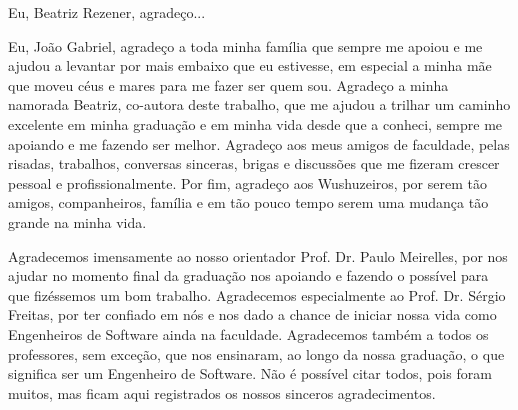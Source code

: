 \begin{agradecimentos}

Eu, Beatriz Rezener, agradeço...

Eu, João Gabriel, agradeço a toda minha família que sempre me apoiou e me ajudou a levantar por mais embaixo que eu estivesse, em especial a minha mãe que moveu céus e mares para me fazer ser quem sou.
Agradeço a minha namorada Beatriz, co-autora deste trabalho, que me ajudou a trilhar um caminho excelente em minha graduação e em minha vida desde que a conheci, sempre me apoiando e me fazendo ser melhor.
Agradeço aos meus amigos de faculdade, pelas risadas, trabalhos, conversas sinceras, brigas e discussões que me fizeram crescer pessoal e profissionalmente.
Por fim, agradeço aos Wushuzeiros, por serem tão amigos, companheiros, família e em tão pouco tempo serem uma mudança tão grande na minha vida.

Agradecemos imensamente ao nosso orientador Prof. Dr. Paulo Meirelles, por nos ajudar no momento final da graduação nos apoiando e fazendo o possível para que fizéssemos um bom trabalho.
Agradecemos especialmente ao Prof. Dr. Sérgio Freitas, por ter confiado em nós e nos dado a chance de iniciar nossa vida como Engenheiros de Software ainda na faculdade.
Agradecemos também a todos os professores, sem exceção, que nos ensinaram, ao longo da nossa graduação, o que significa ser um Engenheiro de Software. Não é possível citar todos, 
pois foram muitos, mas ficam aqui registrados os nossos sinceros agradecimentos.

\end{agradecimentos}
